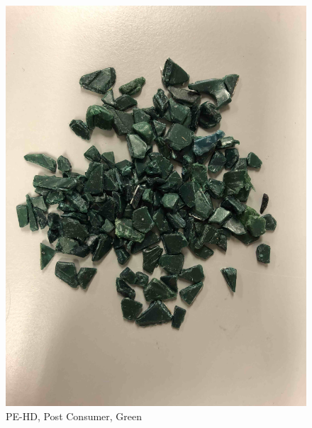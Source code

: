 \begin{appendices}
\begin{figure}
    \centering
    \includegraphics[width = 12cm]{Images/appendix/PE-Regrind-(Post-Consumer)-green.jpg}
    \caption[$\; \:$PE-HD Post Consumer, Green]{PE-HD, Post Consumer, Green}
    \label{fig:pehd-green}
\end{figure}


\end{appendices}
